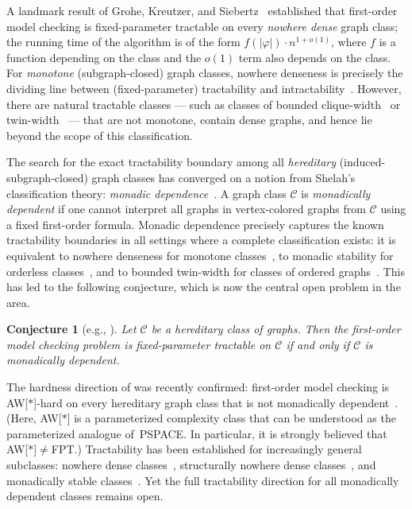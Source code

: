 \documentclass[11pt]{article}
\newtheorem{conjecture}[theorem]{Conjecture}
\theoremstyle{definition}
\newcommand{\CC}{{\mathscr C}}
\begin{document}
A landmark result of Grohe, Kreutzer, and Siebertz~\cite{grohe2017deciding} established that first-order model checking is fixed-parameter tractable on every \emph{nowhere dense} graph class; the running time of the algorithm is of the form $f(|\varphi|)\cdot n^{1+o(1)}$, where $f$ is a function depending on the class and the $o(1)$ term also depends on the class. For \emph{monotone} (subgraph-closed) graph classes, nowhere denseness is precisely the dividing line between (fixed-parameter) tractability and intractability~\cite{DvorakKT13-journal, grohe2017deciding}. However, there are natural tractable classes --- such as classes of bounded clique-width~\cite{courcelle2000linear} or twin-width~\cite{twwI} --- that are not monotone, contain dense graphs, and hence lie beyond the scope of this classification.

The search for the exact tractability boundary among all \emph{hereditary} (induced-subgraph-closed) graph classes has converged on a notion from Shelah's classification theory: \emph{monadic dependence}~\cite{baldwin1985second}. A graph class $\CC$ is \emph{monadically dependent} if one cannot interpret all graphs in vertex-colored graphs from $\CC$ using a fixed first-order formula. Monadic dependence precisely captures the known tractability boundaries in all settings where a complete classification exists: it is equivalent to nowhere denseness for monotone classes~\cite{adler2014interpreting}, to monadic stability for orderless classes~\cite{nevsetvril2021rankwidth}, and to bounded twin-width for classes of ordered graphs~\cite{twwIV}. This has led to the following conjecture, which is now the central open problem in the area.

\begin{conjecture}[e.g., \cite{warwick-problems,twwIV,ssmc,bddeg}]\label{conj:main}
Let $\CC$ be a hereditary class of graphs. Then the first-order model checking problem is fixed-parameter tractable on $\CC$ if and only if $\CC$ is monadically dependent.
\end{conjecture}

The hardness direction of  was recently confirmed: first-order model checking is AW[$*$]-hard on every hereditary graph class that is not monadically dependent~\cite{flip-breakability}. (Here, AW[$*$] is a parameterized complexity class that can be understood as the parameterized analogue of~PSPACE. In particular, it is strongly believed that AW[$*$]$\neq$FPT.) Tractability has been established for increasingly general subclasses: nowhere dense classes~\cite{grohe2017deciding}, structurally nowhere dense classes~\cite{ssmc}, and monadically stable classes~\cite{stable_MC}.
Yet the full tractability direction for all monadically dependent classes remains open.
\end{document}
